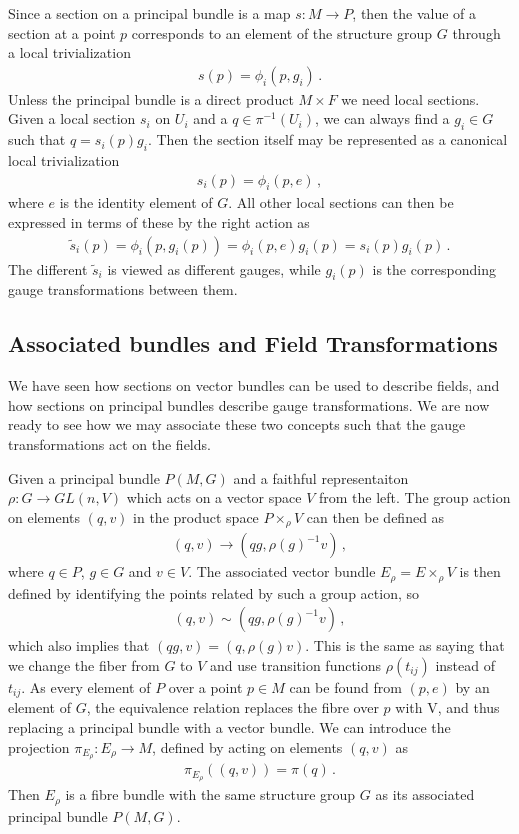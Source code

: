 Since a section on a principal bundle is a map $s:M\rightarrow P$, then the value of a section at a point $p$ corresponds to an element of the structure group $G$ through a local trivialization
\begin{align}
    s(p)=\phi_{i}(p,g_{i})\,.
\end{align}
Unless the principal bundle is a direct product $M\times F$ we need local sections. Given a local section $s_i$ on $U_i$ and a $q\in \pi^{-1}(U_i)$, we can always find a $g_{i}\in G$ such that $q=s_{i}(p)g_{i}$. Then the section itself may be represented as a canonical local trivialization
\begin{align}
    s_{i}(p)=\phi_{i}(p,e)\,,
\end{align}
where $e$ is the identity element of $G$. All other local sections can then be expressed in terms of these by the right action as
\begin{align}
    \tilde{s}_{i}(p)=\phi_{i}(p,g_{i}(p))=\phi_{i}(p,e)g_{i}(p)=s_{i}(p)g_{i}(p)\,.
\end{align}
The different $\tilde{s}_{i}$ is viewed as different gauges, while $g_{i}(p)$ is the corresponding gauge transformations between them.

\subsection*{Associated bundles and Field Transformations}
We have seen how sections on vector bundles can be used to describe fields, and how sections on principal bundles describe gauge transformations. We are now ready to see how we may associate these two concepts such that the gauge transformations act on the fields.

Given a principal bundle $P(M,G)$ and a faithful representaiton $\rho:G\rightarrow GL(n,V)$ which acts on a vector space $V$ from the left. The group action on elements $(q,v)$ in the product space $P\times_{\rho} V$ can then be defined as
\begin{align}
    (q,v)\rightarrow  (qg,\rho(g)^{-1}v)\,,
\end{align}
where $q\in P$, $g\in G$ and $v\in V$. The associated vector bundle $E_{\rho}=E\times_{\rho}V$ is then defined by identifying the points related by such a group action, so
\begin{align}
    (q,v)\sim (qg,\rho(g)^{-1}v)\,,
\end{align}
which also implies that $(qg,v)=(q,\rho(g)v)$. This is the same as saying that we change the fiber from $G$ to $V$ and use transition functions $\rho(t_{ij})$ instead of $t_{ij}$. As every element of $P$ over a point $p\in M$ can be found from $(p,e)$ by an element of $G$, the equivalence relation replaces the fibre over $p$ with V, and thus replacing a principal bundle with a vector bundle. We can introduce the projection $\pi_{E_{\rho}}:E_{\rho}\rightarrow M$, defined by acting on elements $(q,v)$ as
\begin{align}
    \pi_{E_{\rho}}((q,v))=\pi(q)\,.
\end{align}
Then $E_{\rho}$ is a fibre bundle with the same structure group $G$ as its associated principal bundle $P(M,G)$. 


